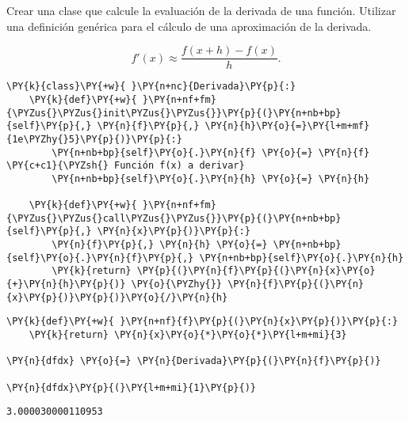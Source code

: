 \begin{example}
Crear una clase que calcule la evaluación de la derivada de una función.
Utilizar una definición genérica para el cálculo de una aproximación de
la derivada.

\[ f'(x) \approx \dfrac{f(x+h) - f(x)}{h}. \]

    \begin{tcolorbox}[breakable, size=fbox, boxrule=1pt, pad at break*=1mm,colback=cellbackground, colframe=cellborder]
\begin{Verbatim}[commandchars=\\\{\}]
\PY{k}{class}\PY{+w}{ }\PY{n+nc}{Derivada}\PY{p}{:}
    \PY{k}{def}\PY{+w}{ }\PY{n+nf+fm}{\PYZus{}\PYZus{}init\PYZus{}\PYZus{}}\PY{p}{(}\PY{n+nb+bp}{self}\PY{p}{,} \PY{n}{f}\PY{p}{,} \PY{n}{h}\PY{o}{=}\PY{l+m+mf}{1e\PYZhy{}5}\PY{p}{)}\PY{p}{:}
        \PY{n+nb+bp}{self}\PY{o}{.}\PY{n}{f} \PY{o}{=} \PY{n}{f}  \PY{c+c1}{\PYZsh{} Función f(x) a derivar}
        \PY{n+nb+bp}{self}\PY{o}{.}\PY{n}{h} \PY{o}{=} \PY{n}{h}
    
    \PY{k}{def}\PY{+w}{ }\PY{n+nf+fm}{\PYZus{}\PYZus{}call\PYZus{}\PYZus{}}\PY{p}{(}\PY{n+nb+bp}{self}\PY{p}{,} \PY{n}{x}\PY{p}{)}\PY{p}{:}
        \PY{n}{f}\PY{p}{,} \PY{n}{h} \PY{o}{=} \PY{n+nb+bp}{self}\PY{o}{.}\PY{n}{f}\PY{p}{,} \PY{n+nb+bp}{self}\PY{o}{.}\PY{n}{h}
        \PY{k}{return} \PY{p}{(}\PY{n}{f}\PY{p}{(}\PY{n}{x}\PY{o}{+}\PY{n}{h}\PY{p}{)} \PY{o}{\PYZhy{}} \PY{n}{f}\PY{p}{(}\PY{n}{x}\PY{p}{)}\PY{p}{)}\PY{o}{/}\PY{n}{h}
\end{Verbatim}
\end{tcolorbox}

    \begin{tcolorbox}[breakable, size=fbox, boxrule=1pt, pad at break*=1mm,colback=cellbackground, colframe=cellborder]
\begin{Verbatim}[commandchars=\\\{\}]
\PY{k}{def}\PY{+w}{ }\PY{n+nf}{f}\PY{p}{(}\PY{n}{x}\PY{p}{)}\PY{p}{:}
    \PY{k}{return} \PY{n}{x}\PY{o}{*}\PY{o}{*}\PY{l+m+mi}{3}

\PY{n}{dfdx} \PY{o}{=} \PY{n}{Derivada}\PY{p}{(}\PY{n}{f}\PY{p}{)}

\PY{n}{dfdx}\PY{p}{(}\PY{l+m+mi}{1}\PY{p}{)}
\end{Verbatim}
\end{tcolorbox}

            \begin{tcolorbox}[breakable, size=fbox, boxrule=.5pt, pad at break*=1mm, opacityfill=0]
\begin{Verbatim}[commandchars=\\\{\}]
3.000030000110953
\end{Verbatim}
\end{tcolorbox}
\end{example}


